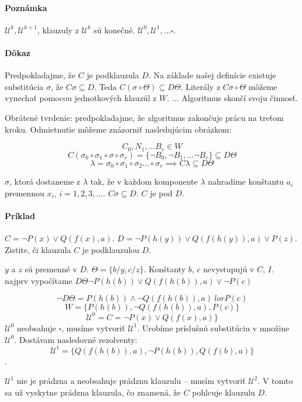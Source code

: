 \paragraph{Poznámka} $\mathcal{U}^k, \mathcal{U}^{k+1}$, klauzuly z
$\mathcal{U}^{k}$ sú konečné. $\mathcal{U}^0, \mathcal{U}^1, \ldots \square$.

\paragraph{Dôkaz} Predpokladajme, že $C$ je podklauzula $D$. Na základe našej
definície existuje substitúcia $\sigma$, že $C\sigma \subseteq D$. Teda
$C(\sigma \circ \Theta) \subseteq D\Theta$. Literály z $C\sigma \circ \Theta$
môžeme vynechať pomocou jednotkových klauzúl z $W$. ... Algoritmus skončí svoju
činnosť.
\par
Obrátené tvrdenie: predpokladajme, že algoritmus zakončuje prácu na treťom
kroku. Odmietnutie môžeme znázorniť nasledujúcim obrázkom:


$$C_0, N_1 ,\ldots B_r \in W$$
$$C(\sigma_0 \circ \sigma_1 \circ \sigma \circ \sigma_r) = \{ \neg B_0, \neg
B_1, \ldots \neg B_r\} \subseteq D\Theta$$
$$\lambda = \sigma_0 \circ \sigma_1 \circ \sigma_2 \ldots \circ \sigma_r \implies
C \lambda \subseteq D\Theta$$

$\sigma$, ktorá dostaneme z $\lambda$ tak, že v každom komponente $\lambda$
nahradíme  konštantu $a_i$ premennou $x_i$, $i=1, 2, 3, \ldots$. $C\sigma
\subseteq D$. $C$ je pod $D$.

\paragraph{Príklad} $C = \neg P(x) \lor Q(f(x), a)$. $D = \neg P(h(y)) \lor
Q(f(h(y)),a) \lor P(z)$. Zistite, či klauzula $C$ je podklauzulou $D$.

\par $y$ a $z$ sú premenné v $D$. $\Theta = \{ b/y, c/z\}$. Konštanty $b$, $c$
nevystupujú v $C$, $I$. najprv vypočítame $D\Theta \neg P(h(b)) \lor
Q(f(h(b)),a) \lor \neg P(c)$

$$\neg D \Theta = P(h(b)) \land \neg Q(f(h(b)),a) \ lor P(c)$$
$$W = \{P(h(b)), \neg Q(f(h(b)),a), P(c) \}$$
$$\mathcal{U}^0 = C = \neg P(x) \lor Q(f(x),a)\}$$
$\mathcal{U}^0$ neobsahuje $\square$, musíme vytvoriť $\mathcal{U}^1$. Urobíme
príslušnú substitúciu v množine $\mathcal{U}^0$. Dostávam nasledovné rezolventy:
$$\mathcal{U}^1 = \{ Q(f(h(b)),a), \neg P(h(b)), Q(f(b),a)\}$$. 
\par
$\mathcal{U}^1$
nie je prádzna a neobsahuje prádznu klauzulu -- musím vytvoriť $\mathcal{U}^2$.
V tomto sa už vyskytne prádzna klauzula, čo znamená, že $C$ pohlcuje klauzulu
$D$.


